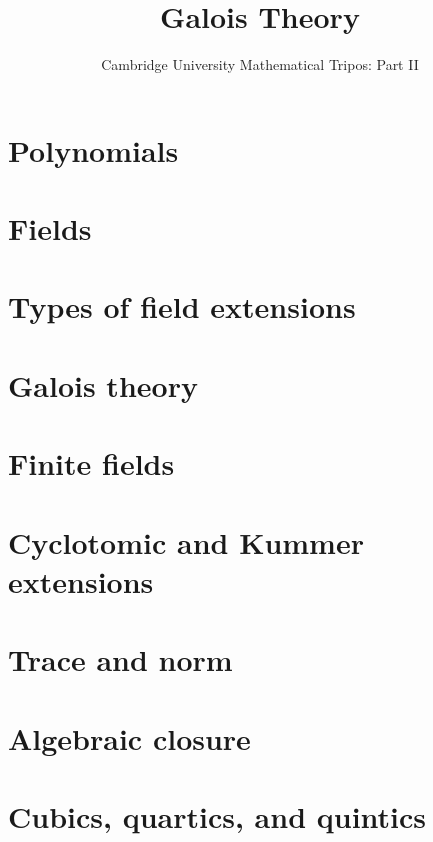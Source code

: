\documentclass{article}
\title{Galois Theory}
\author{Cambridge University Mathematical Tripos: Part II}
\begin{document}
\maketitle

\tableofcontentsnewpage{}

\section{Polynomials}

\section{Fields}

\section{Types of field extensions}

\section{Galois theory}

\section{Finite fields}

\section{Cyclotomic and Kummer extensions}

\section{Trace and norm}

\section{Algebraic closure}

\section{Cubics, quartics, and quintics}

\end{document}
